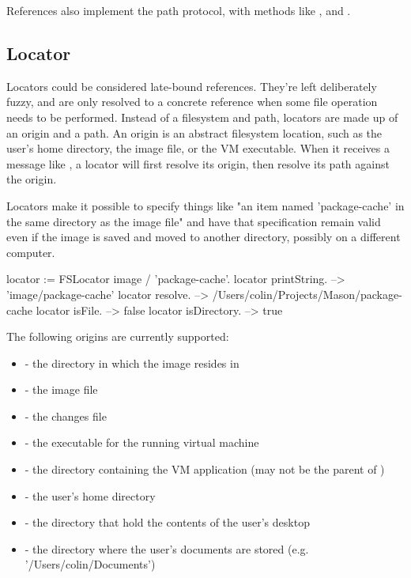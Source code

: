 \documentclass[a4paper,10pt,twoside]{book}
\begin{document}
References also implement the path protocol, with methods like \ct{/} ,  and .

\subsection{Locator}

Locators could be considered late-bound references. They're left deliberately fuzzy, and are only resolved to a concrete reference when some file operation needs to be performed. Instead of a filesystem and path, locators are made up of an origin and a path. An origin is an abstract filesystem location, such as the user's home directory, the image file, or the VM executable. When it receives a message like , a locator will first resolve its origin, then resolve its path against the origin.

Locators make it possible to specify things like "an item named 'package-cache' in the same directory as the image file" and have that specification remain valid even if the image is saved and moved to another directory, possibly on a different computer.

\begin{code}{}
    locator := FSLocator image / 'package-cache'.
    locator printString.             --> '{image}/package-cache'
    locator resolve.                 --> /Users/colin/Projects/Mason/package-cache
    locator isFile.                  --> false
    locator isDirectory.             --> true
\end{code}	

The following origins are currently supported:

\begin{itemize}
\item {} - the directory in which the image resides in
\item{} - the image file
\item{} - the changes file
\item{} - the executable for the running virtual machine
\item{} - the directory containing the VM application (may not be the parent of )
\item{} - the user's home directory
\item{} - the directory that hold the contents of the user's desktop
\item{} - the directory where the user's documents are stored (e.g. '/Users/colin/Documents')
\end{itemize}
\end{document}
